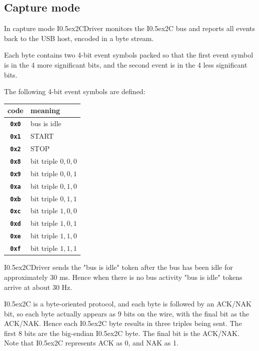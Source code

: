\documentclass{article}
\newcommand{\two}{\raise0.5ex\hbox{\footnotesize{2}}}
\newcommand{\iic}{I\two{}C}
\newcommand{\iicdriver}{I\two{}CDriver}
\newcommand{\mach}[1]{\texttt{\textbf{#1}}}
\newcommand{\gap}{\vspace{10pt}}
\begin{document}
\newpage
\subsection{Capture mode}\label{capture}

In capture mode \iicdriver{} monitors the \iic{} bus and
reports all events back to the USB host,
encoded in a byte stream.

Each byte contains two 4-bit event symbols packed so that the
first event symbol is in the 4 more significant bits,
and the second event is in the 4 less significant bits.

\gap
{}

\gap
The following 4-bit event symbols are defined:

\gap
\begin{center}\begin{tabular}{cl}
\hline
code & meaning \\
\hline
  \mach{0x0}         & bus is idle \\
  \mach{0x1}         & START \\
  \mach{0x2}         & STOP \\
  \mach{0x8}         & bit triple $0,0,0$ \\
  \mach{0x9}         & bit triple $0,0,1$ \\
  \mach{0xa}         & bit triple $0,1,0$ \\
  \mach{0xb}         & bit triple $0,1,1$ \\
  \mach{0xc}         & bit triple $1,0,0$ \\
  \mach{0xd}         & bit triple $1,0,1$ \\
  \mach{0xe}         & bit triple $1,1,0$ \\
  \mach{0xf}         & bit triple $1,1,1$ \\
\hline
\end{tabular}\end{center}\gap

\iicdriver{} sends the "bus is idle" token after the bus has been idle
for approximately 30 ms. Hence 
when there is no bus activity
"bus is idle" tokens arrive at about 30 Hz.

\iic{} is a byte-oriented protocol, and each byte is followed by an ACK/NAK bit,
so each byte actually appears as 9 bits on the wire, with the final bit as the ACK/NAK.
Hence each \iic{} byte results in three triples being sent.
The first 8 bits are the big-endian \iic{} byte.
The final bit is the ACK/NAK.
Note that \iic{} represents ACK as 0, and NAK as 1.
\end{document}
